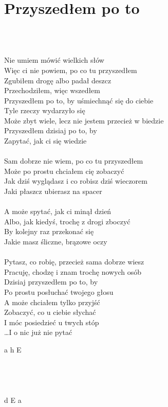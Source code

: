 \documentclass[a5paper, 10pt]{book}
\begin{document}
\section{Przyszedłem po to}\textcolor{lightgray}{\textit{}}\\~\\
\begin{minipage}[t]{0.8\textwidth}
  Nie umiem mówić wielkich słów\\
  Więc ci nie powiem, po co tu przyszedłem\\
  Zgubiłem drogę albo padał deszcz\\
  Przechodziłem, więc wszedłem\\

  \hspace*{5mm}Przyszedłem po to, by uśmiechnąć się do ciebie\\

  Tyle rzeczy wydarzyło się\\
  Może zbyt wiele, lecz nie jestem przecież w biedzie\\
  Przyszedłem dzisiaj po to, by\\
  Zapytać, jak ci się wiedzie\\
  \\
  Sam dobrze nie wiem, po co tu przyszedłem\\
  Może po prostu chciałem cię zobaczyć\\
  Jak dziś wyglądasz i co robisz dziś wieczorem\\
  Jaki płaszcz ubierasz na spacer\\
  \\
  A może spytać, jak ci minął dzień\\
  Albo, jak kiedyś, trochę z drogi zboczyć\\
  By kolejny raz przekonać się\\
  Jakie masz śliczne, brązowe oczy\\
  \\
  Pytasz, co robię, przecież sama dobrze wiesz\\
  Pracuję, chodzę i znam trochę nowych osób\\
  Dzisiaj przyszedłem po to, by\\
  Po prostu posłuchać twojego głosu\\

  A może chciałem tylko przyjść\\
  Zobaczyć, co u ciebie słychać\\
  I móc posiedzieć u twych stóp\\
  \hspace*{1.4cm}\ldots I o nic już nie pytać\\
\end{minipage}
\begin{minipage}[t]{0.2\textwidth}
  a h E\\~\\~\\~\\~\\
  d E a\\

\end{minipage}
\end{document}
